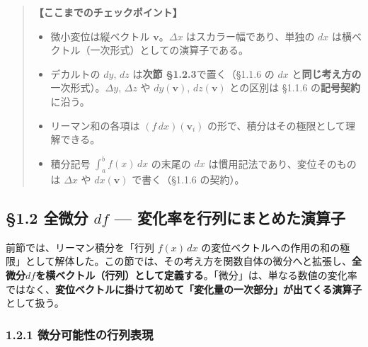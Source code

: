 \documentclass[a4paper,12pt,openany]{book}
\begin{document}
\begin{quote}
\textbf{【ここまでのチェックポイント】}

\begin{itemize}
\item
  微小変位は縦ベクトル \(\mathbf{v}\)。\(\Delta x\)
  はスカラー幅であり、単独の \(dx\)
  は横ベクトル（一次形式）としての演算子である。
\item
  デカルトの \(dy\), \(dz\) は\textbf{次節 §1.2.3}で置く（§1.1.6 の
  \(dx\) と\textbf{同じ考え方の}一次形式）。\(\Delta y\), \(\Delta z\)
  や \(dy(\mathbf{v})\), \(dz(\mathbf{v})\) との区別は §1.1.6
  の\textbf{記号契約}に沿う。
\item
  リーマン和の各項は \((f\,dx)(\mathbf{v}_i)\)
  の形で、積分はその極限として理解できる。
\item
  積分記号 \(\int_a^b f(x)\,dx\) の末尾の \(dx\)
  は慣用記法であり、変位そのものは \(\Delta x\) や \(dx(\mathbf{v})\)
  で書く（§1.1.6 の契約）。
\end{itemize}
\end{quote}

\par\vspace{0.35em}\par

\hypertarget{ux5168ux5faeux5206-df-ux5909ux5316ux7387ux3092ux884cux5217ux306bux307eux3068ux3081ux305fux6f14ux7b97ux5b50}{%
\subsection{\texorpdfstring{§1.2 全微分 \(df\) —
変化率を行列にまとめた演算子}{§1.2 全微分 df — 変化率を行列にまとめた演算子}}\label{ux5168ux5faeux5206-df-ux5909ux5316ux7387ux3092ux884cux5217ux306bux307eux3068ux3081ux305fux6f14ux7b97ux5b50}}

前節では、リーマン積分を「行列 \(f(x)\,dx\)
の変位ベクトルへの作用の和の極限」として解体した。この節では、その考え方を関数自体の微分へと拡張し、\textbf{全微分}\(df\)\textbf{を横ベクトル（行列）として定義する}。「微分」は、単なる数値の変化率ではなく、\textbf{変位ベクトルに掛けて初めて「変化量の一次部分」が出てくる演算子}として扱う。

\hypertarget{ux5faeux5206ux53efux80fdux6027ux306eux884cux5217ux8868ux73fe}{%
\subsubsection{1.2.1
微分可能性の行列表現}\label{ux5faeux5206ux53efux80fdux6027ux306eux884cux5217ux8868ux73fe}}
\end{document}
